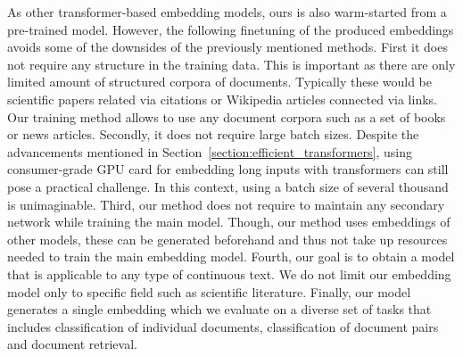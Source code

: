 As other transformer-based embedding models, ours is also warm-started from a
pre-trained model. However, the following finetuning of the produced embeddings
avoids some of the downsides of the previously mentioned methods. First it does
not require any structure in the training data. This is important as there are
only limited amount of structured corpora of documents. Typically these would
be scientific papers related via citations or Wikipedia articles connected via
links. Our training method allows to use any document corpora such as a set of
books or news articles. Secondly, it does not require large batch sizes.
Despite the advancements mentioned in
Section~\ref{section:efficient_transformers}, using consumer-grade GPU card for
embedding long inputs with transformers can still pose a practical challenge.
In this context, using a batch size of several thousand is unimaginable. Third,
our method does not require to maintain any secondary network while training
the main model. Though, our method uses embeddings of other models, these can
be generated beforehand and thus not take up resources needed to train the main
embedding model. Fourth, our goal is to obtain a model that is applicable to
any type of continuous text. We do not limit our embedding model only to
specific field such as scientific literature. Finally, our model generates a
single embedding which we evaluate on a diverse set of tasks that includes
classification of individual documents, classification of document pairs and
document retrieval.
